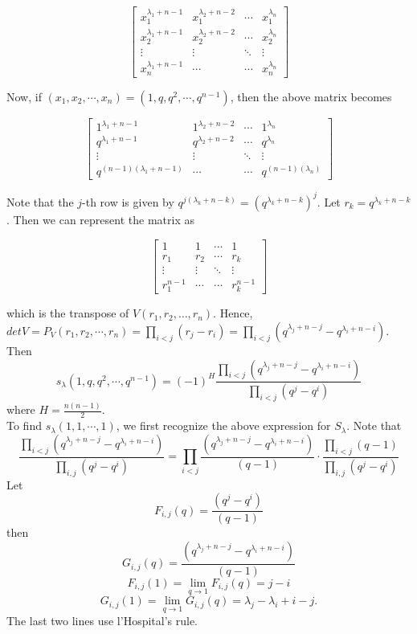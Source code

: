 \documentclass[12pt]{article}
\begin{document}
$$\begin{bmatrix} x_1^{\lambda_1 + n - 1} & x_1^{\lambda_2 + n - 2} &  \cdots & x_1^{\lambda_n} \\
x_2^{\lambda_1 + n - 1} & x_2^{\lambda_2 + n - 2} & \cdots & x_2^{\lambda_n} \\
\vdots & \vdots & \ddots & \vdots \\
x_n^{\lambda_1 + n - 1} & \cdots & \cdots & x_n^{\lambda_n} 
\end{bmatrix}$$

Now, if $(x_1, x_2, \cdots, x_n) = (1, q, q^2, \cdots, q^{n-1})$, then the above matrix becomes

$$\begin{bmatrix} 1^{\lambda_1 + n - 1} & 1^{\lambda_2 + n - 2} &  \cdots & 1^{\lambda_n} \\
q^{\lambda_1 + n - 1} & q^{\lambda_2 + n - 2} & \cdots & q^{\lambda_n} \\
\vdots & \vdots & \ddots & \vdots \\
q^{(n-1)(\lambda_1 + n - 1)} & \cdots & \cdots & q^{(n-1)(\lambda_n)} 
\end{bmatrix}
$$

Note that the $j$-th row is given by $q^{j(\lambda_k + n - k)}  = (q^{\lambda_k + n - k})^j$. Let $r_k = q^{\lambda_k + n - k}$. Then we can represent the matrix as

$$\begin{bmatrix} 1 & 1 & \cdots & 1 \\
r_1 & r_2 & \cdots & r_k \\
\vdots & \vdots & \ddots & \vdots \\
r_1^{n-1} & \cdots & \cdots & r_k^{n-1} 
\end{bmatrix} $$

which is the transpose of $V(r_1, r_2, \dots, r_n)$. Hence, $det V = P_V (r_1, r_2, \cdots, r_n) = \prod_{i < j} (r_j - r_i) = \prod _{i < j} ( q^{\lambda_j + n - j} - q^{\lambda_i + n - i} )$. Then 
$$s_\lambda(1, q, q^2, \cdots, q^{n-1}) = (-1)^H \frac{\prod_{i < j} (q^{\lambda_j + n - j} - q^{\lambda_i + n - i} )}{\prod_{i<j} (q^j - q^ i)}$$
where $H = \frac{n(n-1)}{2}$.\\

To find $s_\lambda(1, 1, \cdots, 1)$, we first recognize the above expression for $S_\lambda$. Note that
$$\frac{\prod_{i < j} (q^{\lambda_j + n - j} - q^{\lambda_i + n - i} )}{
	\prod_{i, j} (q^j - q^ i)} =  \prod_{i < j} \frac{(q^{\lambda_j + n - j} - q^{\lambda_i + n - i} )}{(q - 1)}\cdot\frac{\prod_{i<j}(q - 1)}{\prod_{i, j} (q^j - q^i)}$$
Let
$$F_{i, j}(q)  = \frac{(q^j - q^i)}{(q - 1)}$$
then 
$$G_{i, j}(q) = \frac{(q^{\lambda_j + n - j} - q^{\lambda_i + n - i})}{ (q - 1)}$$ 
$$F_{i, j}(1) = \lim_{q\to 1} F_{i,j}(q) = j - i $$
$$G_{i, j}(1)  = \lim_{q\to 1} G_{i,j}(q) = \lambda_j - \lambda_i + i - j.$$
The last two lines use l'Hospital's rule.
\end{document}

